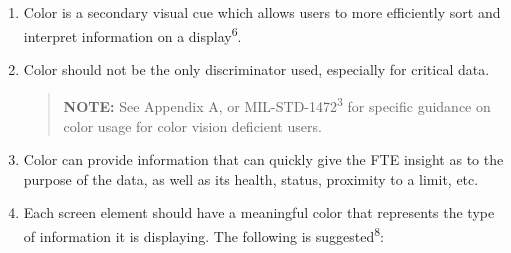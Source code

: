 \documentclass[
]{book}
\begin{document}
\begin{enumerate}
\begin{enumerate}
    \begin{enumerate}
    \def\labelenumiii{\arabic{enumiii}.}
    \item
      Color is a secondary visual cue which allows users to more efficiently sort and interpret information on a display\textsuperscript{6}.
    \item
      Color should not be the only discriminator used, especially for critical data.

      \begin{quote}
      \textbf{NOTE:} See Appendix A, or MIL-STD-1472\textsuperscript{3} for specific guidance on color usage for color vision deficient users.
      \end{quote}
    \item
      Color can provide information that can quickly give the FTE insight as to the purpose of the data, as well as its health, status, proximity to a limit, etc.
    \item
      Each screen element should have a meaningful color that represents the type of information it is displaying. The following is suggested\textsuperscript{8}:
    \end{enumerate}


\end{enumerate}
\end{enumerate}
\end{document}

